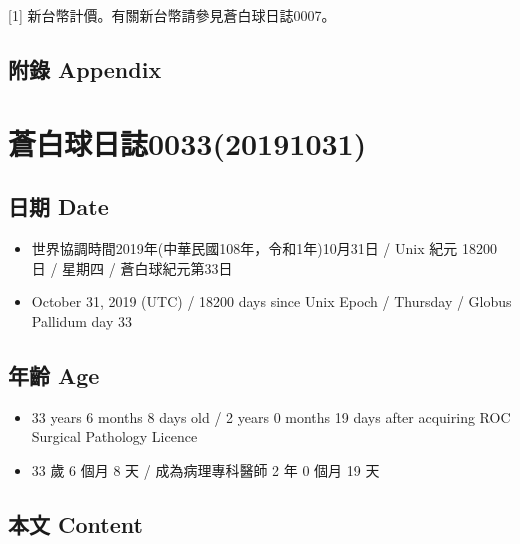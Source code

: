 \documentclass[a5paper, 12pt
]{book}
\providecommand{\tightlist}{%
  \setlength{\itemsep}{0pt}\setlength{\parskip}{0pt}}
\begin{document}
{[}1{]} 新台幣計價。有關新台幣請參見蒼白球日誌0007。

\hypertarget{ux9644ux9304-appendix-24}{%
\subsection{附錄 Appendix}\label{ux9644ux9304-appendix-24}}

\hypertarget{ux84bcux767dux7403ux65e5ux8a8c003320191031}{%
\section{蒼白球日誌0033(20191031)}\label{ux84bcux767dux7403ux65e5ux8a8c003320191031}}

\hypertarget{ux65e5ux671f-date-32}{%
\subsection{日期 Date}\label{ux65e5ux671f-date-32}}

\begin{itemize}
\tightlist
\item
  世界協調時間2019年(中華民國108年，令和1年)10月31日 / Unix 紀元 18200
  日 / 星期四 / 蒼白球紀元第33日
\item
  October 31, 2019 (UTC) / 18200 days since Unix Epoch / Thursday /
  Globus Pallidum day 33
\end{itemize}

\hypertarget{ux5e74ux9f61-age-32}{%
\subsection{年齡 Age}\label{ux5e74ux9f61-age-32}}

\begin{itemize}
\tightlist
\item
  33 years 6 months 8 days old / 2 years 0 months 19 days after
  acquiring ROC Surgical Pathology Licence
\item
  33 歲 6 個月 8 天 / 成為病理專科醫師 2 年 0 個月 19 天
\end{itemize}

\hypertarget{ux672cux6587-content-32}{%
\subsection{本文 Content}\label{ux672cux6587-content-32}}
\end{document}
